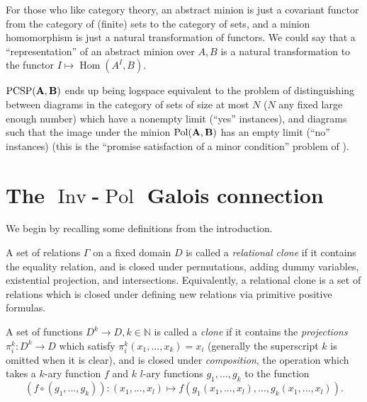 \documentclass[letterpaper,11pt]{article}
\DeclareMathOperator{\Pol}{Pol}
\DeclareMathOperator{\Inv}{Inv}
\DeclareMathOperator{\Hom}{Hom}
\begin{document}
\begin{rem} For those who like category theory, an abstract minion is just a covariant functor from the category of (finite) sets to the category of sets, and a minion homomorphism is just a natural transformation of functors. We could say that a ``representation'' of an abstract minion over $A,B$ is a natural transformation to the functor $I \mapsto \Hom(A^I,B)$.

$\operatorname{PCSP}(\mathbf{A},\mathbf{B})$ ends up being logspace equivalent to the problem of distinguishing between diagrams in the category of sets of size at most $N$ ($N$ any fixed large enough number) which have a nonempty limit (``yes'' instances), and diagrams such that the image under the minion $\Pol(\fA,\fB)$ has an empty limit (``no'' instances) (this is the ``promise satisfaction of a minor condition'' problem of \cite{pcsp-coloring-full}).
\end{rem}




\section{The $\Inv$-$\Pol$ Galois connection}\label{section-inv-pol}


We begin by recalling some definitions from the introduction.

\begin{defn} A set of relations $\Gamma$ on a fixed domain $D$ is called a \emph{relational clone} if it contains the equality relation, and is closed under permutations, adding dummy variables, existential projection, and intersections. Equivalently, a relational clone is a set of relations which is closed under defining new relations via primitive positive formulas.
\end{defn}

\begin{defn} A set of functions $D^k \rightarrow D, k \in \mathbb{N}$ is called a \emph{clone} if it contains the \emph{projections} $\pi_i^k : D^k \rightarrow D$ which satisfy $\pi_i^k(x_1, ..., x_k) = x_i$ (generally the superscript $k$ is omitted when it is clear), and is closed under \emph{composition}, the operation which takes a $k$-ary function $f$ and $k$ $l$-ary functions $g_1, ..., g_k$ to the function
\[
(f\circ (g_1, ..., g_k)) : (x_1, ..., x_{l}) \mapsto f(g_1(x_1, ..., x_l), ..., g_k(x_{1}, ..., x_{l})).
\]
\end{defn}
\end{document}
